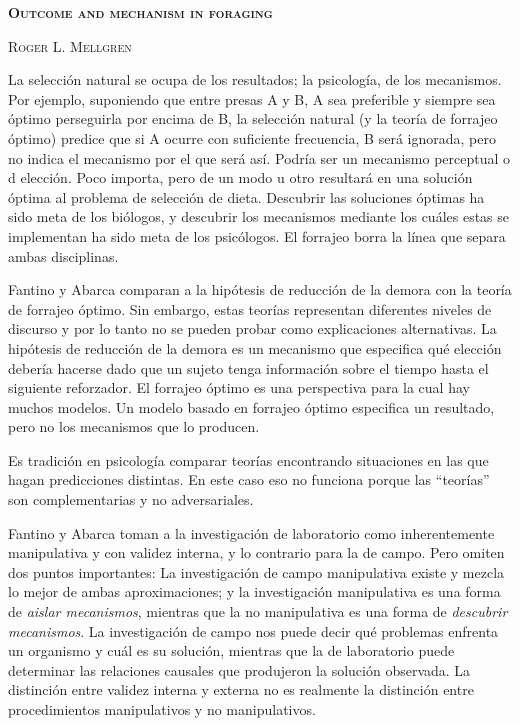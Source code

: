 \documentclass[a4paper,12pt]{article}
\begin{document}
{\scshape\bfseries Outcome and mechanism in foraging}

{\scshape Roger L. Mellgren}

La selección natural se ocupa de los resultados; la psicología, de los mecanismos. Por ejemplo, suponiendo que entre presas A y B, A sea preferible y siempre sea óptimo perseguirla por encima de B, la selección natural (y la teoría de forrajeo óptimo) predice que si A ocurre con suficiente frecuencia, B será ignorada, pero no indica el mecanismo por el que será así. Podría ser un mecanismo perceptual o d elección. Poco importa, pero de un modo u otro resultará en una solución óptima al problema de selección de dieta. Descubrir las soluciones óptimas ha sido meta de los biólogos, y descubrir los mecanismos mediante los cuáles estas se implementan ha sido meta de los psicólogos. El forrajeo borra la línea que separa ambas disciplinas.

Fantino y Abarca comparan a la hipótesis de reducción de la demora con la teoría de forrajeo óptimo. Sin embargo, estas teorías representan diferentes niveles de discurso y por lo tanto no se pueden probar como explicaciones alternativas. La hipótesis de reducción de la demora es un mecanismo que especifica qué elección debería hacerse dado que un sujeto tenga información sobre el tiempo hasta el siguiente reforzador. El forrajeo óptimo es una perspectiva para la cual hay muchos modelos. Un modelo basado en forrajeo óptimo especifica un resultado, pero no los mecanismos que lo producen.

Es tradición en psicología comparar teorías encontrando situaciones en las que hagan predicciones distintas. En este caso eso no funciona porque las ``teorías'' son complementarias y no  adversariales. 

Fantino y Abarca toman a la investigación de laboratorio como inherentemente manipulativa y con validez interna, y lo contrario para la de campo. Pero omiten dos puntos importantes: La investigación de campo manipulativa existe y mezcla lo mejor de ambas aproximaciones; y la investigación manipulativa es una forma de {\itshape aislar mecanismos}, mientras que la no manipulativa es una forma de {\itshape descubrir mecanismos}. La investigación de campo nos puede decir qué problemas enfrenta un organismo y cuál es su solución, mientras que la de laboratorio puede determinar las relaciones causales que produjeron la solución observada. La distinción entre validez interna y externa no es realmente la distinción entre procedimientos manipulativos y no manipulativos.
\end{document}
